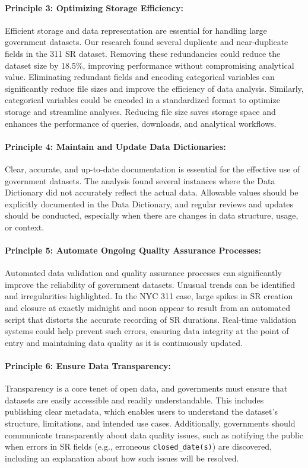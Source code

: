 \documentclass[linenumber]{jdsart}
\begin{document}
\paragraph{Principle 3: Optimizing Storage Efficiency:}
Efficient storage and data representation are essential for handling 
large government datasets. Our research found several duplicate and
near-duplicate fields in the 311 SR dataset. Removing these
redundancies could reduce the dataset size by 18.5\%, improving
performance without compromising analytical value. Eliminating 
redundant fields and encoding categorical variables can 
significantly reduce file sizes and improve the efficiency 
of data analysis. Similarly, categorical variables could be 
encoded in a standardized format to optimize storage and 
streamline analyses. Reducing file size saves storage space 
and enhances the performance of queries, downloads, and analytical workflows.


\paragraph{Principle 4: Maintain and Update Data Dictionaries:}
Clear, accurate, and up-to-date documentation 
is essential for the effective use 
of government datasets. The analysis found several instances where the 
Data Dictionary did not accurately reflect the actual data. Allowable 
values should be explicitly documented in the Data Dictionary, and regular 
reviews and updates should be conducted, especially when there are 
changes in data structure, usage, or context.


\paragraph{Principle 5: Automate Ongoing Quality Assurance Processes:}
Automated data validation and quality assurance processes can 
significantly improve the reliability of government 
datasets. Unusual trends can be identified and irregularities highlighted.
In the NYC 311 case, large spikes in SR creation and closure at
exactly midnight and noon appear to result from an automated script
that distorts the accurate recording of SR durations. Real-time validation systems could
help prevent such errors, ensuring data integrity at the point of entry and
maintaining data quality as it is continuously updated.


\paragraph{Principle 6: Ensure Data Transparency:}
Transparency is a core tenet of open data, and governments must ensure 
that datasets are easily accessible and 
readily understandable. This includes publishing clear 
metadata, which enables users to understand the 
dataset’s structure, limitations, and intended use
cases. Additionally, governments should communicate transparently
about data quality issues, such as notifying the public when errors in SR 
fields (e.g., erroneous \texttt{closed\_date(s)}) are discovered, including
an explanation about how such issues will be resolved.
\end{document}
